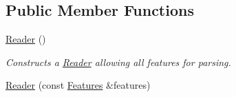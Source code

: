 \subsection*{Public Member Functions}
\begin{DoxyCompactItemize}
\item 
\hyperlink{classJson_1_1Reader_a0b3c4e24c8393354bab57a6ba3ffc27f}{Reader} ()\hypertarget{classJson_1_1Reader_a0b3c4e24c8393354bab57a6ba3ffc27f}{}\label{classJson_1_1Reader_a0b3c4e24c8393354bab57a6ba3ffc27f}

\begin{DoxyCompactList}\small\item\em Constructs a \hyperlink{classJson_1_1Reader}{Reader} allowing all features for parsing. \end{DoxyCompactList}\item 
\hyperlink{classJson_1_1Reader_a45f17831118337309180313e93ac33f8}{Reader} (const \hyperlink{classJson_1_1Features}{Features} \&features)\hypertarget{classJson_1_1Reader_a45f17831118337309180313e93ac33f8}{}\label{classJson_1_1Reader_a45f17831118337309180313e93ac33f8}


\end{DoxyCompactItemize}
